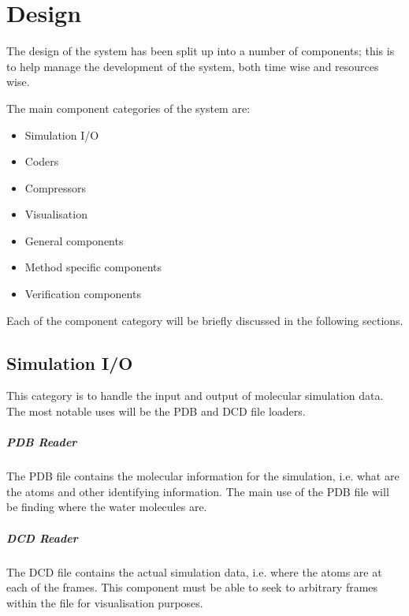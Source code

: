 \chapter{Design}
\label{chap:Design}

The design of the system has been split up into a number of components; this is
to help manage the development of the system, both time wise and resources
wise.

The main component categories of the system are:
\begin{itemize}
  \item Simulation I/O
  \item Coders
  \item Compressors
  \item Visualisation
  \item General components
  \item Method specific components
  \item Verification components
\end{itemize}

Each of the component category will be briefly discussed in the following sections.


\section{Simulation I/O}
\label{sec:simulationio}

This category is to handle the input and output of molecular simulation data.
The most notable uses will be the PDB and DCD file loaders.

\paragraph{PDB Reader}

The PDB file contains the molecular information for the simulation, i.e. what
are the atoms and other identifying information. The main use of the PDB file
will be finding where the water molecules are.


\paragraph{DCD Reader}

The DCD file contains the actual simulation data, i.e. where the atoms are at
each of the frames. This component must be able to seek to arbitrary frames
within the file for visualisation purposes.

